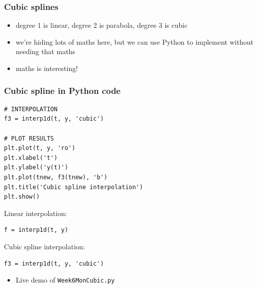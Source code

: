 \documentclass[english,14pt]{beamer}
\begin{document}

\begin{frame}[fragile]

\frametitle{Cubic splines}

\begin{itemize}
	\item degree 1 is linear, degree 2 is parabola, degree 3 is cubic
	\item we're hiding lots of maths here, but we can use Python to implement without needing that maths
	\item maths is interesting!
\end{itemize}

\end{frame}


\begin{frame}[fragile]

\frametitle{Cubic spline in Python code}

\begin{lstlisting}[style=CStyle,basicstyle=\scriptsize]
# INTERPOLATION
f3 = interp1d(t, y, 'cubic')

# PLOT RESULTS
plt.plot(t, y, 'ro')
plt.xlabel('t')
plt.ylabel('y(t)')
plt.plot(tnew, f3(tnew), 'b')
plt.title('Cubic spline interpolation')
plt.show()
\end{lstlisting}

Linear interpolation:
\begin{lstlisting}[style=CStyle,basicstyle=\scriptsize]
f = interp1d(t, y)
\end{lstlisting}

Cubic spline interpolation:
\begin{lstlisting}[style=CStyle,basicstyle=\scriptsize]
f3 = interp1d(t, y, 'cubic')
\end{lstlisting}

\begin{itemize}
	\item Live demo of \texttt{Week6MonCubic.py}
\end{itemize}

\end{frame}

\end{document}
